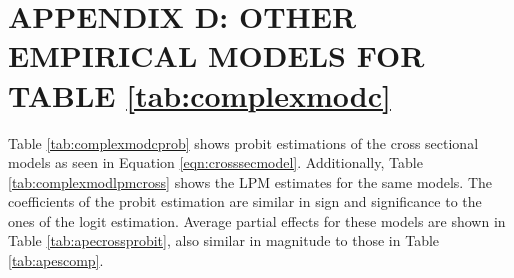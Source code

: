 \documentclass[floatsintext,man]{apa7}\usepackage[]{graphicx}\usepackage[]{color}
\begin{document}
\section{APPENDIX D: OTHER EMPIRICAL MODELS FOR TABLE \ref{tab:complexmodc}}

Table \ref{tab:complexmodcprob} shows probit estimations of the cross sectional models as seen in Equation \ref{eqn:crosssecmodel}. Additionally, Table \ref{tab:complexmodlpmcross} shows the LPM estimates for the same models. The coefficients of the probit estimation are similar in sign and significance to the ones of the logit estimation. Average partial effects for these models are shown in Table \ref{tab:apecrossprobit}, also similar in magnitude to those in Table \ref{tab:apescomp}.
\clearpage

\renewcommand{\arraystretch}{0.6}
\end{document}
